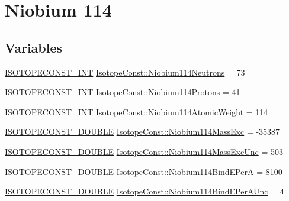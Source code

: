\hypertarget{group___isotope_const-_niobium-_nb114}{}\section{Niobium 114}
\label{group___isotope_const-_niobium-_nb114}
\subsection*{Variables}
\begin{DoxyCompactItemize}
\item 
\mbox{\hyperlink{group___isotope_const-_macros_ga5f18360b3e99483a35c32d789e62621c}{I\+S\+O\+T\+O\+P\+E\+C\+O\+N\+S\+T\+\_\+\+I\+NT}} \mbox{\hyperlink{group___isotope_const-_niobium-_nb114_gadfa2d5e278947921f8b8daf394f750ac}{Isotope\+Const\+::\+Niobium114\+Neutrons}} = 73
\item 
\mbox{\hyperlink{group___isotope_const-_macros_ga5f18360b3e99483a35c32d789e62621c}{I\+S\+O\+T\+O\+P\+E\+C\+O\+N\+S\+T\+\_\+\+I\+NT}} \mbox{\hyperlink{group___isotope_const-_niobium-_nb114_ga6ef4465dfe4e0651754b87ba511a439a}{Isotope\+Const\+::\+Niobium114\+Protons}} = 41
\item 
\mbox{\hyperlink{group___isotope_const-_macros_ga5f18360b3e99483a35c32d789e62621c}{I\+S\+O\+T\+O\+P\+E\+C\+O\+N\+S\+T\+\_\+\+I\+NT}} \mbox{\hyperlink{group___isotope_const-_niobium-_nb114_gab41e9c6d51e7a85d23611cf8a7112083}{Isotope\+Const\+::\+Niobium114\+Atomic\+Weight}} = 114
\item 
\mbox{\hyperlink{group___isotope_const-_macros_ga8f45a7272ce02c0b4c65c44636ed719a}{I\+S\+O\+T\+O\+P\+E\+C\+O\+N\+S\+T\+\_\+\+D\+O\+U\+B\+LE}} \mbox{\hyperlink{group___isotope_const-_niobium-_nb114_ga296d7c35ba7774f5fa0d2517d0e2363b}{Isotope\+Const\+::\+Niobium114\+Mass\+Exc}} = -\/35387
\item 
\mbox{\hyperlink{group___isotope_const-_macros_ga8f45a7272ce02c0b4c65c44636ed719a}{I\+S\+O\+T\+O\+P\+E\+C\+O\+N\+S\+T\+\_\+\+D\+O\+U\+B\+LE}} \mbox{\hyperlink{group___isotope_const-_niobium-_nb114_ga9a75098a63c2810787301de4ad870c8b}{Isotope\+Const\+::\+Niobium114\+Mass\+Exc\+Unc}} = 503
\item 
\mbox{\hyperlink{group___isotope_const-_macros_ga8f45a7272ce02c0b4c65c44636ed719a}{I\+S\+O\+T\+O\+P\+E\+C\+O\+N\+S\+T\+\_\+\+D\+O\+U\+B\+LE}} \mbox{\hyperlink{group___isotope_const-_niobium-_nb114_gae8b68b7cab9c725c44bfec3be9f28fb6}{Isotope\+Const\+::\+Niobium114\+Bind\+E\+PerA}} = 8100
\item 
\mbox{\hyperlink{group___isotope_const-_macros_ga8f45a7272ce02c0b4c65c44636ed719a}{I\+S\+O\+T\+O\+P\+E\+C\+O\+N\+S\+T\+\_\+\+D\+O\+U\+B\+LE}} \mbox{\hyperlink{group___isotope_const-_niobium-_nb114_ga1131cc95f90eb2aea903a9a47fa5868a}{Isotope\+Const\+::\+Niobium114\+Bind\+E\+Per\+A\+Unc}} = 4

\end{DoxyCompactItemize}
